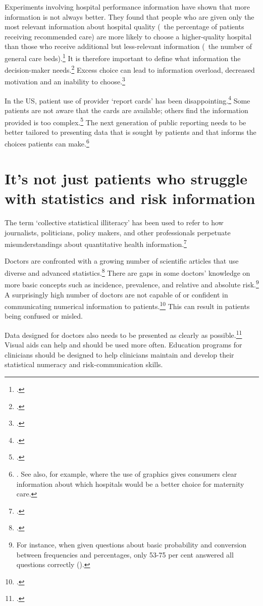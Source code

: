 \documentclass[FrontPage]{grattan}
\begin{document}
Experiments involving hospital performance information have shown that more information is not always better. They found that people who are given only the most relevant information about hospital quality (\eg~the percentage of patients receiving recommended care) are more likely to choose a higher-quality hospital than those who receive additional but less-relevant information (\eg~the number of general care beds).\footcite{RN84}
It is therefore important to define what information the decision-maker needs.\footcite{RN84}
Excess choice can lead to information overload, decreased motivation and an inability to choose.\footcite{RN85}

In the US, patient use of provider ‘report cards’ has been disappointing.\footcite{findlay2016consumers}
Some patients are not aware that the cards are available; others find the information provided is too complex.\footcite{findlay2016consumers}
The next generation of public reporting needs to be better tailored to presenting data that is sought by patients and that informs the choices patients can make.\footnote{\textcites{RN87}{RN86}.
See also, for example, \textcite{BHI2017maternity} where the use of graphics gives consumers clear information about which hospitals would be a better choice for maternity care.}  

\section{It’s not just patients who struggle with statistics and risk information}\label{sec:notpatients}
The term ‘collective statistical illiteracy’ has been used to refer to how journalists, politicians, policy makers, and other professionals perpetuate misunderstandings about quantitative health information.\footcite{RN88}

Doctors are confronted with a growing number of scientific articles that use diverse and advanced statistics.\footcite{RN89}
There are gaps in some doctors’ knowledge on more basic concepts such as incidence, prevalence, and relative and absolute risk.\footnote{For instance, when given questions about basic probability and conversion between frequencies and percentages, only 53-75 per cent answered all questions correctly (\textcite{anderson2014numerical}).}
A surprisingly high number of doctors are not capable of or confident in communicating numerical information to patients.\footcites{RN92}{RN83}{RN91}
This can result in patients being confused or misled. 

Data designed for doctors also needs to be presented as clearly as possible.\footcite{RN93}
Visual aids can help and should be used more often. Education programs for clinicians should be designed to help clinicians maintain and develop their statistical numeracy and risk-communication skills.
\end{document}
